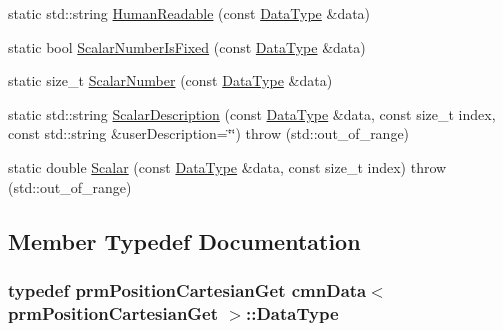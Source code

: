 \begin{DoxyCompactItemize}
\item 
static std\-::string \hyperlink{classcmn_data_3_01prm_position_cartesian_get_01_4_ab302aecf9c91047598d6ce8a4dd965c3}{Human\-Readable} (const \hyperlink{classcmn_data_3_01prm_position_cartesian_get_01_4_a4c0c73a046fbb0962651979bd5734bbd}{Data\-Type} \&data)
\item 
static bool \hyperlink{classcmn_data_3_01prm_position_cartesian_get_01_4_af1314fdbe2d70473e7baf754bada2989}{Scalar\-Number\-Is\-Fixed} (const \hyperlink{classcmn_data_3_01prm_position_cartesian_get_01_4_a4c0c73a046fbb0962651979bd5734bbd}{Data\-Type} \&data)
\item 
static size\-\_\-t \hyperlink{classcmn_data_3_01prm_position_cartesian_get_01_4_a45f1344acdd79e6dfca23ee5cad90485}{Scalar\-Number} (const \hyperlink{classcmn_data_3_01prm_position_cartesian_get_01_4_a4c0c73a046fbb0962651979bd5734bbd}{Data\-Type} \&data)
\item 
static std\-::string \hyperlink{classcmn_data_3_01prm_position_cartesian_get_01_4_ab13b91fab6c9b8a2f84869e12942498c}{Scalar\-Description} (const \hyperlink{classcmn_data_3_01prm_position_cartesian_get_01_4_a4c0c73a046fbb0962651979bd5734bbd}{Data\-Type} \&data, const size\-\_\-t index, const std\-::string \&user\-Description=\char`\"{}\char`\"{})  throw (std\-::out\-\_\-of\-\_\-range)
\item 
static double \hyperlink{classcmn_data_3_01prm_position_cartesian_get_01_4_a578074d27b2cbac35a428f7bef5ef07e}{Scalar} (const \hyperlink{classcmn_data_3_01prm_position_cartesian_get_01_4_a4c0c73a046fbb0962651979bd5734bbd}{Data\-Type} \&data, const size\-\_\-t index)  throw (std\-::out\-\_\-of\-\_\-range)
\end{DoxyCompactItemize}


\subsection{Member Typedef Documentation}
\hypertarget{classcmn_data_3_01prm_position_cartesian_get_01_4_a4c0c73a046fbb0962651979bd5734bbd}{
\subsubsection[{Data\-Type}]{\setlength{\rightskip}{0pt plus 5cm}typedef {\bf prm\-Position\-Cartesian\-Get} {\bf cmn\-Data}$<$ {\bf prm\-Position\-Cartesian\-Get} $>$\-::{\bf Data\-Type}}}\label{classcmn_data_3_01prm_position_cartesian_get_01_4_a4c0c73a046fbb0962651979bd5734bbd}


